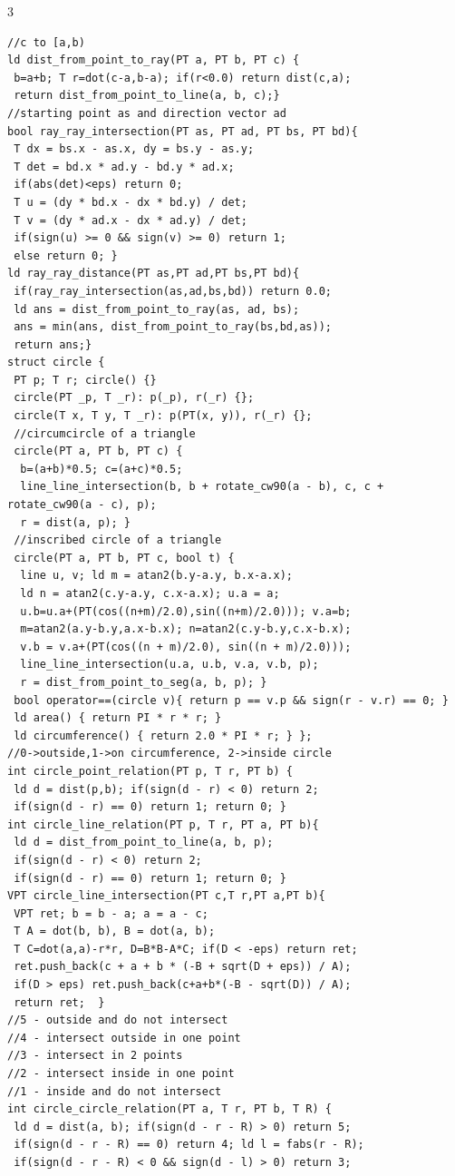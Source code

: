 \documentclass[8pt,a4paper,onesided]{article}
\begin{document}
\begin{multicols}{3}
\begin{verbatim}
//c to [a,b)
ld dist_from_point_to_ray(PT a, PT b, PT c) {
 b=a+b; T r=dot(c-a,b-a); if(r<0.0) return dist(c,a);
 return dist_from_point_to_line(a, b, c);}
//starting point as and direction vector ad
bool ray_ray_intersection(PT as, PT ad, PT bs, PT bd){
 T dx = bs.x - as.x, dy = bs.y - as.y;
 T det = bd.x * ad.y - bd.y * ad.x;
 if(abs(det)<eps) return 0;
 T u = (dy * bd.x - dx * bd.y) / det;
 T v = (dy * ad.x - dx * ad.y) / det;
 if(sign(u) >= 0 && sign(v) >= 0) return 1;
 else return 0; }
ld ray_ray_distance(PT as,PT ad,PT bs,PT bd){
 if(ray_ray_intersection(as,ad,bs,bd)) return 0.0;
 ld ans = dist_from_point_to_ray(as, ad, bs);
 ans = min(ans, dist_from_point_to_ray(bs,bd,as));
 return ans;}
struct circle {
 PT p; T r; circle() {}
 circle(PT _p, T _r): p(_p), r(_r) {};
 circle(T x, T y, T _r): p(PT(x, y)), r(_r) {};
 //circumcircle of a triangle
 circle(PT a, PT b, PT c) {
  b=(a+b)*0.5; c=(a+c)*0.5;
  line_line_intersection(b, b + rotate_cw90(a - b), c, c + rotate_cw90(a - c), p);
  r = dist(a, p); }
 //inscribed circle of a triangle
 circle(PT a, PT b, PT c, bool t) {
  line u, v; ld m = atan2(b.y-a.y, b.x-a.x);
  ld n = atan2(c.y-a.y, c.x-a.x); u.a = a;
  u.b=u.a+(PT(cos((n+m)/2.0),sin((n+m)/2.0))); v.a=b;
  m=atan2(a.y-b.y,a.x-b.x); n=atan2(c.y-b.y,c.x-b.x);
  v.b = v.a+(PT(cos((n + m)/2.0), sin((n + m)/2.0)));
  line_line_intersection(u.a, u.b, v.a, v.b, p);
  r = dist_from_point_to_seg(a, b, p); }
 bool operator==(circle v){ return p == v.p && sign(r - v.r) == 0; }
 ld area() { return PI * r * r; }
 ld circumference() { return 2.0 * PI * r; } };
//0->outside,1->on circumference, 2->inside circle
int circle_point_relation(PT p, T r, PT b) {
 ld d = dist(p,b); if(sign(d - r) < 0) return 2;
 if(sign(d - r) == 0) return 1; return 0; }
int circle_line_relation(PT p, T r, PT a, PT b){
 ld d = dist_from_point_to_line(a, b, p);
 if(sign(d - r) < 0) return 2;
 if(sign(d - r) == 0) return 1; return 0; }
VPT circle_line_intersection(PT c,T r,PT a,PT b){
 VPT ret; b = b - a; a = a - c;
 T A = dot(b, b), B = dot(a, b);
 T C=dot(a,a)-r*r, D=B*B-A*C; if(D < -eps) return ret;
 ret.push_back(c + a + b * (-B + sqrt(D + eps)) / A);
 if(D > eps) ret.push_back(c+a+b*(-B - sqrt(D)) / A);
 return ret;  }
//5 - outside and do not intersect
//4 - intersect outside in one point
//3 - intersect in 2 points
//2 - intersect inside in one point
//1 - inside and do not intersect
int circle_circle_relation(PT a, T r, PT b, T R) {
 ld d = dist(a, b); if(sign(d - r - R) > 0) return 5;
 if(sign(d - r - R) == 0) return 4; ld l = fabs(r - R);
 if(sign(d - r - R) < 0 && sign(d - l) > 0) return 3;

\end{verbatim}
\end{multicols}
\end{document}
